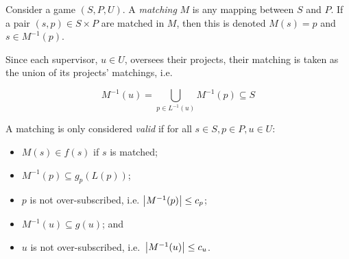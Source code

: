\begin{definition}\label{def:sa_matching}
    Consider a game \((S, P, U)\). A \emph{matching} \(M\) is any mapping
    between \(S\) and \(P\). If a pair \((s, p) \in S \times P\) are matched in
    \(M\), then this is denoted \(M(s) = p\) and \(s \in M^{-1}(p)\).

    Since each supervisor, \(u \in U\), oversees their projects, their matching
    is taken as the union of its projects' matchings, i.e.

    \begin{equation}
        M^{-1}(u) = \bigcup_{p \in L^{-1}(u)} M^{-1}(p) \subseteq S
    \end{equation}

    A matching is only considered \emph{valid} if for all \(s \in S, p \in P, u
    \in U\):

    \begin{itemize}
        \item \(M(s) \in f(s)\) if \(s\) is matched;
        \item \(M^{-1}(p) \subseteq g_p(L(p))\);
        \item \(p\) is not over-subscribed, i.e. \(\abs*{M^{-1}(p)} \le c_p\);
        \item \(M^{-1}(u) \subseteq g(u)\); and
        \item \(u\) is not over-subscribed, i.e.\ \(\abs*{M^{-1}(u)} \leq c_u\).
    \end{itemize}
\end{definition}

